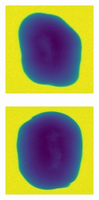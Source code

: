 \documentclass[11pt]{article}
\begin{document}
\begin{figure}[!h]
\begin{subfigure}[b]{0.22\textwidth}
         \caption{}
         \label{fig:hollow_29}
     \end{subfigure}
     \hfill
     \begin{subfigure}[b]{0.22\textwidth}
         \centering
         \includegraphics[width=\textwidth]{figurer/potato_dataset/hollow/hollow_30.jpg}
         \caption{}
         \label{fig:hollow_30}
     \end{subfigure}
     \hfill
     \begin{subfigure}[b]{0.22\textwidth}
         \centering
         \includegraphics[width=\textwidth]{figurer/potato_dataset/hollow/hollow_31.jpg}

\end{subfigure}
\end{figure}
\end{document}

